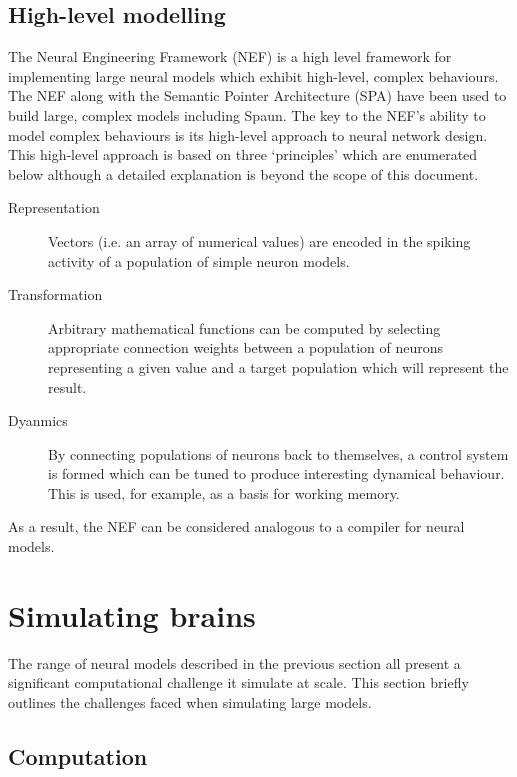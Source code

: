 		\subsection{High-level modelling}
			
			The Neural Engineering Framework (NEF) \cite{eliasmith04} is a high level
			framework for implementing large neural models which exhibit high-level,
			complex behaviours. The NEF along with the Semantic Pointer Architecture
			(SPA) \cite{eliasmith13} have been used to build large, complex models
			including Spaun. The key to the NEF's ability to model complex behaviours
			is its high-level approach to neural network design. This high-level
			approach is based on three `principles' which are enumerated below
			although a detailed explanation is beyond the scope of this document.
			
			\begin{description}
				\item[Representation] Vectors (i.e. an array of numerical values) are
				encoded in the spiking activity of a population of simple neuron models.
				
				\item[Transformation] Arbitrary mathematical functions can be computed
				by selecting appropriate connection weights between a population of
				neurons representing a given value and a target population which will
				represent the result.
				
				\item[Dyanmics] By connecting populations of neurons back to themselves,
				a control system is formed which can be tuned to produce interesting
				dynamical behaviour. This is used, for example, as a basis for working
				memory.
			\end{description}
			
			As a result, the NEF can be considered analogous to a compiler for neural
			models.
		
	
	\section{Simulating brains}
		
		The range of neural models described in the previous section all present a
		significant computational challenge it simulate at scale. This section
		briefly outlines the challenges faced when simulating large models.
		
		
		\subsection{Computation}
			
